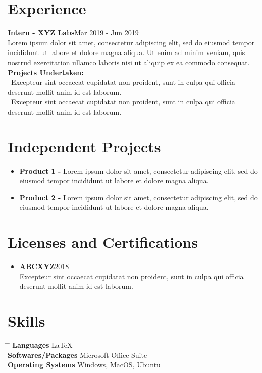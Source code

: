 \documentclass[10pt]{article}
\begin{document}
\section{{\color{battleshipgrey}Experience}}
	{\bf Intern - XYZ Labs}\hfill Mar 2019 - Jun 2019  \\
	\indent
	Lorem ipsum dolor sit amet, consectetur adipiscing elit, sed do eiusmod tempor incididunt ut labore et dolore magna aliqua. Ut enim ad minim veniam, quis nostrud exercitation ullamco laboris nisi ut aliquip ex ea commodo consequat.  \\
	{\indent\bf Projects Undertaken:} \\
	{\indent\textbullet\  Excepteur sint occaecat cupidatat non proident, sunt in culpa qui officia deserunt mollit anim id est laborum.} \\
	{\indent\textbullet\  Excepteur sint occaecat cupidatat non proident, sunt in culpa qui officia deserunt mollit anim id est laborum.}


\section{{\color{battleshipgrey}Independent Projects}}
	\begin{itemize}
		\item{{\bf Product 1 -} Lorem ipsum dolor sit amet, consectetur adipiscing elit, sed do eiusmod tempor incididunt ut labore et dolore magna aliqua.}

		\item{{\bf Product 2 -} Lorem ipsum dolor sit amet, consectetur adipiscing elit, sed do eiusmod tempor incididunt ut labore et dolore magna aliqua.}
	\end{itemize}
	
\section{{\color{battleshipgrey}Licenses and Certifications}}
	\begin{itemize}
		\item{{\bf ABCXYZ}\hfill 2018 \\ 
		Excepteur sint occaecat cupidatat non proident, sunt in culpa qui officia deserunt mollit anim id est laborum.}
	\end{itemize}

\section{{\color{battleshipgrey}Skills}}
	\parbox{\textwidth}{ 
		\begin{tabbing} 
			\hspace{4cm} \= \hspace{4cm} \= \kill 
			{\bf Languages} \> \LaTeX \\ 
			{\bf Softwares/Packages} \>  Microsoft Office Suite \\
			{\bf Operating Systems} \> Windows, MacOS, Ubuntu
		\end{tabbing}
	}
\end{document}
